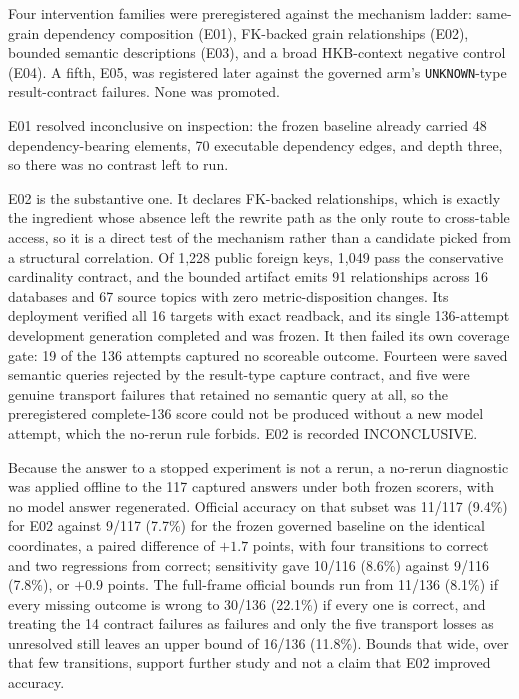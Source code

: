 Four intervention families were preregistered against the mechanism ladder:
same-grain dependency composition (E01), FK-backed grain relationships (E02),
bounded semantic descriptions (E03), and a broad HKB-context negative control
(E04). A fifth, E05, was registered later against the governed arm's
\texttt{UNKNOWN}-type result-contract failures. None was promoted.

E01 resolved inconclusive on inspection: the frozen baseline already carried 48
dependency-bearing elements, 70 executable dependency edges, and depth three, so
there was no contrast left to run.

E02 is the substantive one. It declares FK-backed relationships, which is exactly
the ingredient whose absence left the rewrite path as the only route to
cross-table access, so it is a direct test of the mechanism rather than a
candidate picked from a structural correlation. Of 1,228 public foreign keys,
1,049 pass the conservative cardinality contract, and the bounded artifact emits
91 relationships across 16 databases and 67 source topics with zero
metric-disposition changes. Its deployment verified all 16 targets with exact
readback, and its single 136-attempt development generation completed and was
frozen. It then failed its own coverage gate: 19 of the 136 attempts captured no
scoreable outcome. Fourteen were saved semantic queries rejected by the
result-type capture contract, and five were genuine transport failures that
retained no semantic query at all, so the preregistered complete-136 score could
not be produced without a new model attempt, which the no-rerun rule forbids.
E02 is recorded INCONCLUSIVE.

Because the answer to a stopped experiment is not a rerun, a no-rerun diagnostic
was applied offline to the 117 captured answers under both frozen scorers, with
no model answer regenerated. Official accuracy on that subset was 11/117 (9.4\%)
for E02 against 9/117 (7.7\%) for the frozen governed baseline on the identical
coordinates, a paired difference of $+1.7$ points, with four transitions to
correct and two regressions from correct; sensitivity gave 10/116 (8.6\%) against
9/116 (7.8\%), or $+0.9$ points. The full-frame official bounds run from 11/136
(8.1\%) if every missing outcome is wrong to 30/136 (22.1\%) if every one is
correct, and treating the 14 contract failures as failures and only the five
transport losses as unresolved still leaves an upper bound of 16/136 (11.8\%).
Bounds that wide, over that few transitions, support further study and not a
claim that E02 improved accuracy.

